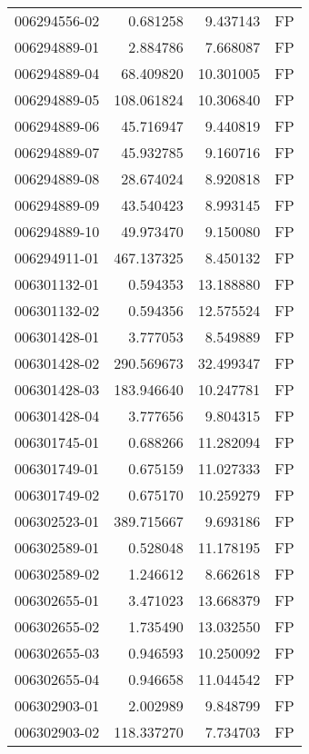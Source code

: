 \begin{tabular}{lrrl}
006294556-02 &    0.681258 &       9.437143 &   FP \\
006294889-01 &    2.884786 &       7.668087 &   FP \\
006294889-04 &   68.409820 &      10.301005 &   FP \\
006294889-05 &  108.061824 &      10.306840 &   FP \\
006294889-06 &   45.716947 &       9.440819 &   FP \\
006294889-07 &   45.932785 &       9.160716 &   FP \\
006294889-08 &   28.674024 &       8.920818 &   FP \\
006294889-09 &   43.540423 &       8.993145 &   FP \\
006294889-10 &   49.973470 &       9.150080 &   FP \\
006294911-01 &  467.137325 &       8.450132 &   FP \\
006301132-01 &    0.594353 &      13.188880 &   FP \\
006301132-02 &    0.594356 &      12.575524 &   FP \\
006301428-01 &    3.777053 &       8.549889 &   FP \\
006301428-02 &  290.569673 &      32.499347 &   FP \\
006301428-03 &  183.946640 &      10.247781 &   FP \\
006301428-04 &    3.777656 &       9.804315 &   FP \\
006301745-01 &    0.688266 &      11.282094 &   FP \\
006301749-01 &    0.675159 &      11.027333 &   FP \\
006301749-02 &    0.675170 &      10.259279 &   FP \\
006302523-01 &  389.715667 &       9.693186 &   FP \\
006302589-01 &    0.528048 &      11.178195 &   FP \\
006302589-02 &    1.246612 &       8.662618 &   FP \\
006302655-01 &    3.471023 &      13.668379 &   FP \\
006302655-02 &    1.735490 &      13.032550 &   FP \\
006302655-03 &    0.946593 &      10.250092 &   FP \\
006302655-04 &    0.946658 &      11.044542 &   FP \\
006302903-01 &    2.002989 &       9.848799 &   FP \\
006302903-02 &  118.337270 &       7.734703 &   FP \\

\end{tabular}
